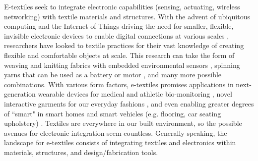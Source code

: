 E-textiles seek to integrate electronic capabilities (sensing, actuating, wireless networking) with textile materials and structures. With the advent of ubiquitous computing and the Internet of Things driving the need for smaller, flexible, invisible electronic devices to enable digital connections at various scales \todo{[48]}, researchers have looked to textile practices for their vast knowledge of creating flexible and comfortable objects at scale. This research can take the form of weaving and knitting fabrics with embedded environmental sensors \todo{[1,73]}, spinning yarns that can be used as a battery or motor \todo{[87,118,144]}, and many more possible combinations. With various form factors, e-textiles promises applications in next-generation wearable devices for medical and athletic bio-monitoring \todo{[97,108]}, novel interactive garments for our everyday fashions \todo{[15,74,93]}, and even enabling greater degrees of ``smart" in smart homes and smart vehicles (e.g. flooring, car seating upholstery) \todo{[71,124]}. Textiles are everywhere in our built environment, so the possible avenues for electronic integration seem countless. Generally speaking, the landscape for e-textiles consists of integrating textiles and electronics within materials, structures, and design/fabrication tools.


